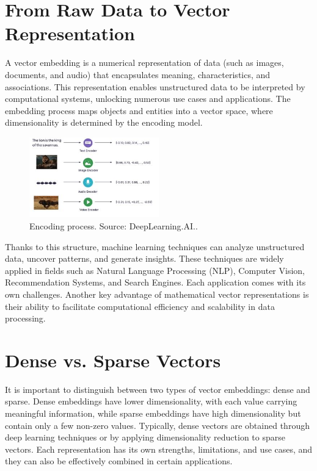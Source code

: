 \section{From Raw Data to Vector Representation}
A vector embedding is a numerical representation of data (such as images, documents, and audio) that encapsulates meaning, characteristics, and associations. This representation enables unstructured data to be interpreted by computational systems, unlocking numerous use cases and applications. The embedding process maps objects and entities into a vector space, where dimensionality is determined by the encoding model.

\begin{figure}[h]
    \centering
    \includegraphics[width=0.5\textwidth]{IMAGES/encode.JPG}
    \caption{Encoding process. Source: DeepLearning.AI.\footnotemark.}
    \label{fig:Encoding}
\end{figure}


Thanks to this structure, machine learning techniques can analyze unstructured data, uncover patterns, and generate insights. These techniques are widely applied in fields such as Natural Language Processing (NLP), Computer Vision, Recommendation Systems, and Search Engines. Each application comes with its own challenges. Another key advantage of mathematical vector representations is their ability to facilitate computational efficiency and scalability in data processing.
\section{Dense vs. Sparse Vectors}

It is important to distinguish between two types of vector embeddings: dense and sparse. Dense embeddings have lower dimensionality, with each value carrying meaningful information, while sparse embeddings have high dimensionality but contain only a few non-zero values. Typically, dense vectors are obtained through deep learning techniques or by applying dimensionality reduction to sparse vectors. Each representation has its own strengths, limitations, and use cases, and they can also be effectively combined in certain applications.

